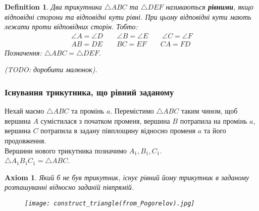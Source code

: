 \documentclass[a4paper, 10pt]{article}
\theoremstyle{theoremdd}
\theoremstyle{theoremdd}
\newtheorem{axiom}{Axiom}
\theoremstyle{theoremdd}
\newtheorem{definition}[theorem]{Definition}
\theoremstyle{theoremdd}
\theoremstyle{theoremdd}
\theoremstyle{theoremdd}
\theoremstyle{theoremdd}
\theoremstyle{theoremdd}
\theoremstyle{theoremdd}
\begin{document}
\iffalse
\begin{definition}
Задано два трикутника $\triangle A_1B_1C_1$, $\triangle A_2B_2C_2$.\\
Ці трикутники називаються \textbf{рівними}, якщо їх можна сумістити накладанням.\\
Позначення: $\triangle A_1B_1C_1 = \triangle A_2B_2C_2$.
\end{definition}
\fi

\begin{definition}
Два трикутника $\triangle ABC$ та $\triangle DEF$  називаються \textbf{рівними}, якщо відповідні сторони та відповідні кути рівні. При цьому відповідні кути мають лежати проти відповідних сторін. Тобто:
\begin{align*}
\angle A = \angle D \qquad \angle B = \angle E \qquad \angle C = \angle F \\
AB = DE \qquad BC = EF \qquad CA = FD 
\end{align*}
Позначення: $\triangle ABC = \triangle DEF$.
\begin{figure}[H]
\centering
{}
\qquad
{}
\end{figure}
(TODO: доробити малюнок).
\end{definition}

\subsubsection{Існування трикутника, що рівний заданому}
Нехай маємо $\triangle ABC$ та промінь $a$. Перемістимо $\triangle ABC$ таким чином, щоб вершина $A$ сумістилася з початком променя, вершина $B$ потрапила на промінь $a$, вершина $C$ потрапила в задану півплощину відносно променя $a$ та його продовження.\\
Вершини нового трикутника позначимо $A_1,B_1,C_1$.\\
$\triangle A_1B_1C_1 = \triangle ABC$.
\begin{axiom}
Який б не був трикутник, існує рівний йому трикутник в заданому розташуванні відносно заданій півпрямій.
\begin{figure}[H]
\centering
\texttt{[image: construct\_triangle(from\_Pogorelov).jpg]}
\end{figure}
\end{axiom}
\end{document}
